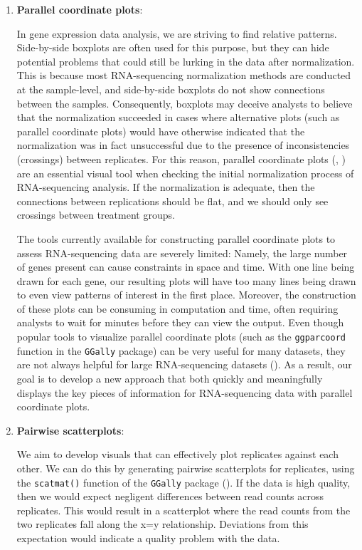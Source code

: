 \documentclass[11pt,a4paper,oldfontcommands,openany]{memoir}
\numberwithin{equation}{section} %
\newcommand{\code}[1]{{\texttt{#1}}}
\begin{document}
\begin{enumerate}
\item \textbf{Parallel coordinate plots}:

In gene expression data analysis, we are striving to find relative patterns. Side-by-side boxplots are often used for this purpose, but they can hide potential problems that could still be lurking in the data after normalization. This is because most RNA-sequencing normalization methods are conducted at the sample-level, and side-by-side boxplots do not show connections between the samples. Consequently, boxplots may deceive analysts to believe that the normalization succeeded in cases where alternative plots (such as parallel coordinate plots) would have otherwise indicated that the normalization was in fact unsuccessful due to the presence of inconsistencies (crossings) between replicates. For this reason, parallel coordinate plots (\citealt{origPCP}, \citealt{origPCP2}) are an essential visual tool when checking the initial normalization process of RNA-sequencing analysis. If the normalization is adequate, then the connections between replications should be flat, and we should only see crossings between treatment groups.

The tools currently available for constructing parallel coordinate plots to assess RNA-sequencing data are severely limited: Namely, the large number of genes present can cause constraints in space and time. With one line being drawn for each gene, our resulting plots will have too many lines being drawn to even view patterns of interest in the first place. Moreover, the construction of these plots can be consuming in computation and time, often requiring analysts to wait for minutes before they can view the output. Even though popular tools to visualize parallel coordinate plots (such as the \code{ggparcoord} function in the \code{GGally} package) can be very useful for many datasets, they are not always helpful for large RNA-sequencing datasets (\citealt{ggally}). As a result, our goal is to develop a new approach that both quickly and meaningfully displays the key pieces of information for RNA-sequencing data with parallel coordinate plots. 

\item \textbf{Pairwise scatterplots}:

We aim to develop visuals that can effectively plot replicates against each other. We can do this by generating pairwise scatterplots for replicates, using the \code{scatmat()} function of the \code{GGally} package (\citealt{ggally}). If the data is high quality, then we would expect negligent differences between read counts across replicates. This would result in a scatterplot where the read counts from the two replicates fall along the x=y relationship. Deviations from this expectation would indicate a quality problem with the data.


\end{enumerate}
\end{document}
